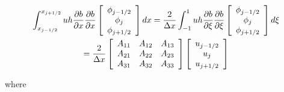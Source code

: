 \documentclass[12pt]{article}
\begin{document}
\begin{multline*}
\int_{x_{j-1/2}}^{x_{j+1/2}}uh\frac{\partial b}{\partial x}\frac{\partial b}{\partial x} \left[\begin{array}{c}\phi_{j-1/2} \\\phi_{j}\\\phi_{j+1/2} \end{array}\right] dx = \frac{2}{\Delta x} \int_{-1}^{1}u h \frac{\partial b}{\partial \xi} \frac{\partial b}{\partial \xi} \left[\begin{array}{c}\phi_{j-1/2} \\\phi_{j}\\\phi_{j+1/2} \end{array}\right] d\xi \\ =
\frac{2}{\Delta x} \left[\begin{array}{c c c } 
A_{11} & A_{12}  & A_{13}\\
A_{21} & A_{22}  & A_{23}\\
A_{31} & A_{32}  & A_{33}\\
\end{array}\right] \left[\begin{array}{c}u_{j-1/2} \\u_{j}\\u_{j+1/2} \end{array}\right]
\end{multline*}

where 
\end{document}
